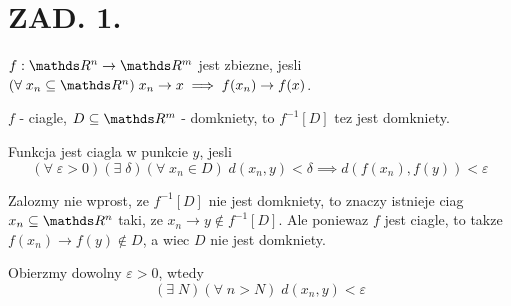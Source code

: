 \documentclass{article}[13pt]
\begin{document}
    \section*{ZAD. 1.}

    $f:\R^n\to\R^m$ jest zbiezne, jesli $(\forall\;x_n\subseteq\R^n)\;x_n\to x\implies f(x_n)\to f(x)$.
    \medskip

    $f$ - ciagle, $D\subseteq\R^m$ - domkniety, to $f^{-1}[D]$ tez jest domkniety.
    
    Funkcja jest ciagla w punkcie $y$, jesli
    $$(\forall\;\varepsilon>0)(\exists\;\delta)(\forall\;x_n\in D)\;d(x_n, y)<\delta\implies d(f(x_n), f(y))<\varepsilon$$

    Zalozmy nie wprost, ze $f^{-1}[D]$ nie jest domkniety, to znaczy istnieje ciag $x_n\subseteq\R^n$ taki, ze $x_n\to y\notin f^{-1}[D]$. Ale poniewaz $f$ jest ciagle, to takze $f(x_n)\to f(y)\notin D$, a wiec $D$ nie jest domkniety. 
    
    Obierzmy dowolny $\varepsilon>0$, wtedy
    $$(\exists\;N)(\forall\;n>N)\;d(x_n, y)<\varepsilon$$
\end{document}
